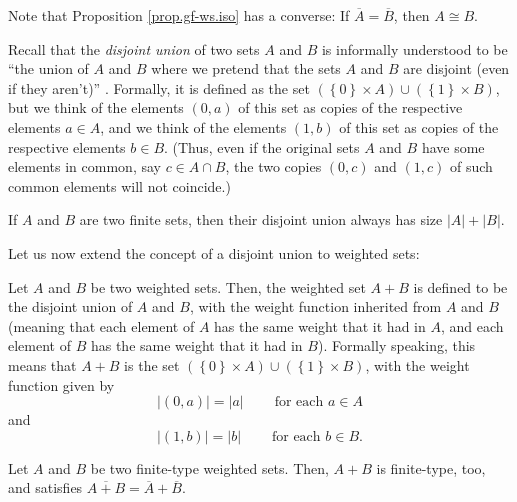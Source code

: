 Note that Proposition \ref{prop.gf-ws.iso} has a converse: If $\overline
{A}=\overline{B}$, then $A\cong B$. \medskip

Recall that the \emph{disjoint union} of two sets $A$ and $B$ is informally
understood to be \textquotedblleft the union of $A$ and $B$ where we pretend
that the sets $A$ and $B$ are disjoint (even if they aren't)\textquotedblright%
. Formally, it is defined as the set $\left(  \left\{  0\right\}  \times
A\right)  \cup\left(  \left\{  1\right\}  \times B\right)  $, but we think of
the elements $\left(  0,a\right)  $ of this set as copies of the respective
elements $a\in A$, and we think of the elements $\left(  1,b\right)  $ of this
set as copies of the respective elements $b\in B$. (Thus, even if the original
sets $A$ and $B$ have some elements in common, say $c\in A\cap B$, the two
copies $\left(  0,c\right)  $ and $\left(  1,c\right)  $ of such common
elements will not coincide.)

If $A$ and $B$ are two finite sets, then their disjoint union always has size
$\left\vert A\right\vert +\left\vert B\right\vert $.

Let us now extend the concept of a disjoint union to weighted sets:

\begin{definition}
\label{def.gf-ws.djun}Let $A$ and $B$ be two weighted sets. Then, the weighted
set $A+B$ is defined to be the disjoint union of $A$ and $B$, with the weight
function inherited from $A$ and $B$ (meaning that each element of $A$ has the
same weight that it had in $A$, and each element of $B$ has the same weight
that it had in $B$). Formally speaking, this means that $A+B$ is the set
$\left(  \left\{  0\right\}  \times A\right)  \cup\left(  \left\{  1\right\}
\times B\right)  $, with the weight function given by
\begin{equation}
\left\vert \left(  0,a\right)  \right\vert =\left\vert a\right\vert
\ \ \ \ \ \ \ \ \ \ \text{for each }a\in A \label{eq.def.gf-ws.djun.wt0}%
\end{equation}
and%
\begin{equation}
\left\vert \left(  1,b\right)  \right\vert =\left\vert b\right\vert
\ \ \ \ \ \ \ \ \ \ \text{for each }b\in B. \label{eq.def.gf-ws.djun.wt1}%
\end{equation}

\end{definition}

\begin{proposition}
\label{prop.gf-ws.djun}Let $A$ and $B$ be two finite-type weighted sets. Then,
$A+B$ is finite-type, too, and satisfies $\overline{A+B}=\overline
{A}+\overline{B}$.
\end{proposition}

